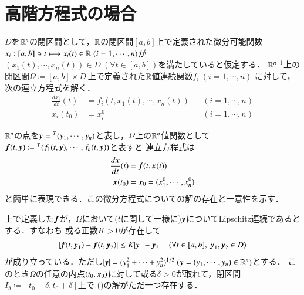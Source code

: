 \section{高階方程式の場合}
	$D$を$\mathbb{R}^n$の閉区間として，$\mathbb{R}$の閉区間$[a,b]$上で定義された微分可能関数$x_i: [a,b] \ni t \longmapsto x_i(t) \in \R\ (i=1,\cdots,n)$が
	$(x_1(t),\cdots,x_n(t)) \in D\ (\forall t \in [a,b])$を満たしていると仮定する．
	$\mathbb{R}^{n+1}$上の閉区間$\Omega \coloneqq [a,b] \times D\ $上で定義された$\mathbb{R}$値連続関数$f_i\ (i=1,\cdots,n)$
	に対して，次の連立方程式を解く．
	\begin{align}
		\frac{dx_i}{dt}(t) &= f_i(t,x_1(t),\cdots,x_n(t)) && (i=1,\cdots,n)\\
		x_i(t_0) &= x_i^0 && (i=1,\cdots,n)
	\end{align}
	
	$\mathbb{R}^n$の点を$\mbox{\boldmath $y$} = {}^T(y_1,\cdots,y_n)$と表し，$\Omega$上の$\mathbb{R}^{n}$値関数として
	$\mbox{\boldmath $f$}(t,\mbox{\boldmath $y$}) \coloneqq {}^T (f_1(t,\mbox{\boldmath $y$}),\cdots,f_n(t,\mbox{\boldmath $y$}))$と表すと
	連立方程式は
	\begin{align}
		\frac{d\mbox{\boldmath $x$}}{dt}(t) &= \mbox{\boldmath $f$}(t,\mbox{\boldmath $x$}(t)) \\
		\mbox{\boldmath $x$}(t_0) &= \mbox{\boldmath $x$}_0 = (x_1^0,\cdots,x_n^0) \label{eq:deff_eq}
	\end{align}
	と簡単に表現できる．この微分方程式についての解の存在と一意性を示す．
	
	\begin{prp}
		上で定義した$\mbox{\boldmath $f$}$が，$\Omega$において($t$に関して一様に)$\mbox{\boldmath $y$}$についてLipschitz連続であるとする．すなわち
		或る正数$K > 0$が存在して
		\begin{align}
			|\Vector{f}(t,\Vector{y}_1) - \Vector{f}(t,\Vector{y}_2)| \leq K|\Vector{y}_1 - \Vector{y}_2| \quad (\forall t \in [a,b],\ \Vector{y}_1, \Vector{y}_2 \in D)
		\end{align}
		が成り立っている．ただし$|\Vector{y}| = (y_1^2 + \cdots + y_n^2)^{1/2}\ (\Vector{y} = (y_1, \cdots, y_n) \in \R^n)$とする．
		このとき$\Omega$の任意の内点$(t_0, \mbox{\boldmath $x$}_0)$に対して或る$\delta > 0$が取れて，閉区間$I_\delta \coloneqq [t_0 - \delta, t_0 + \delta]$上で
		()の解がただ一つ存在する．
	\end{prp}
	
